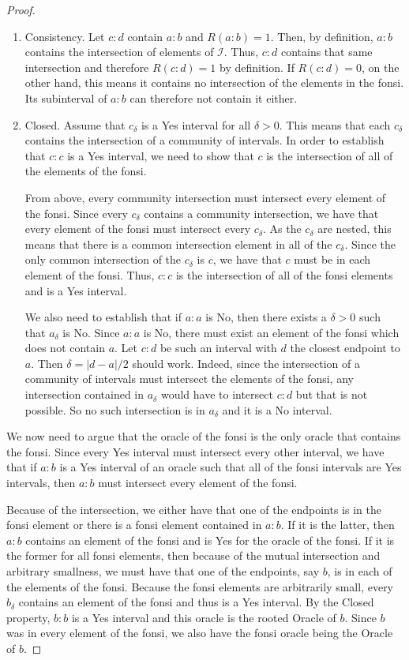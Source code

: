 \documentclass[12pt]{article}
\begin{document}
\begin{proof}
\begin{enumerate}
    \item Consistency. Let $c:d$ contain $a:b$ and $R(a:b)=1$. Then, by definition, $a:b$ contains the intersection of elements of $\mathcal{I}$. Thus, $c:d$ contains that same intersection and therefore $R(c:d)=1$ by definition. If $R(c:d) = 0$, on the other hand, this means it contains no intersection of the elements in the fonsi. Its subinterval of $a:b$ can therefore not contain it either. 
    
    \item Closed. Assume that $c_\delta$ is a Yes interval for all $\delta > 0$. This means that each $c_\delta$ contains the intersection of a community of intervals. In order to establish that $c:c$ is a Yes interval, we need to show that $c$ is the intersection of all of the elements of the fonsi. 

    From above, every community intersection must intersect every element of the fonsi. Since every $c_\delta$ contains a community intersection, we have that every element of the fonsi must intersect every $c_\delta$. As the $c_\delta$ are nested, this means that there is a common intersection element in all of the $c_\delta$. Since the only common intersection of the $c_\delta$ is $c$, we have that $c$ must be in each element of the fonsi.  Thus, $c:c$ is the intersection of all of the fonsi elements and is a Yes interval. 

    We also need to establish that if $a:a$ is No, then there exists a $\delta >0$ such that $a_\delta$ is No. Since $a:a$ is No, there must exist an element of the fonsi which does not contain $a$. Let $c:d$ be such an interval with $d$ the closest endpoint to $a$. Then $\delta = |d-a|/2$ should work. Indeed, since the intersection of a community of intervals must intersect the elements of the fonsi, any intersection contained in $a_\delta$ would have to intersect $c:d$ but that is not possible. So no such intersection is in $a_\delta$ and it is a No interval. 
    
\end{enumerate}

We now need to argue that the oracle of the fonsi is the only oracle that contains the fonsi. Since every Yes interval must intersect every other interval, we have that if $a:b$ is a Yes interval of an oracle such that all of the fonsi intervals are Yes intervals, then $a:b$ must intersect every element of the fonsi. 

Because of the intersection, we either have that one of the endpoints is in the fonsi element or there is a fonsi element contained in $a:b$. If it is the latter, then $a:b$ contains an element of the fonsi and is Yes for the oracle of the fonsi. If it is the former for all fonsi elements, then because of the mutual intersection and arbitrary smallness, we must have that one of the endpoints, say $b$, is in each of the elements of the fonsi.  Because the fonsi elements are arbitrarily small, every $b_\delta$ contains an element of the fonsi and thus is a Yes interval. By the Closed property, $b:b$ is a Yes interval and this oracle is the rooted Oracle of $b$. Since $b$ was in every element of the fonsi, we also have the fonsi oracle being the Oracle of $b$.


\end{proof}
\end{document}
